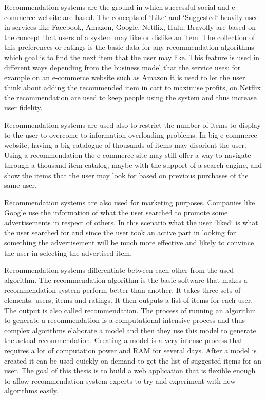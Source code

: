\summary

Recommendation systems are the ground in which successful social and e-commerce website are based. The concepts of `Like` and `Suggested` heavily used in services like Facebook, Amazon, Google, Netflix, Hulu, Bravofly are based on the concept that users of a system may like or dislike an item. The collection of this preferences or ratings is the basic data for any recommendation algorithms which goal is to find the next item that the user may like. This feature is used in different ways depending from the business model that the service uses: for example on an e-commerce website such as Amazon it is used to let the user think about adding the recommended item in cart to maximise profits, on Netflix the recommendation are used to keep people using the system and thus increase user fidelity.

Recommendation systems are used also to restrict the number of items to display to the user to overcome to information overloading problems. In big e-commerce website, having a big catalogue of thousands of items may disorient the user. Using a recommendation the e-commerce site may still offer a way to navigate through a thousand item catalog, maybe with the support of a search engine, and show the items that the user may look for based on previous purchases of the same user.

Recommendation systems are also used for marketing purposes. Companies like Google use the information of what the user searched to promote some advertisements in respect of others. In this scenario what the user `liked` is what the user searched for and since the user took an active part in looking for something the advertisement will be much more effective and likely to convince the user in selecting the advertised item.

Recommendation systems differentiate between each other from the used algorithm. The recommendation algorithm is the basic software that makes a recommendation system perform better than another. It takes three sets of elements: users, items and ratings. It then outputs a list of items for each user. The output is also called recommendation. The process of running an algorithm to generate a recommendation is a computational intensive process and thus complex algorithms elaborate a model and then they use this model to generate the actual recommendation. Creating a model is a very intense process that requires a lot of computation power and RAM for several days. After a model is created it can be used quickly on demand to get the list of suggested items for an user. The goal of this thesis is to build a web application that is flexible enough to allow recommendation system experts to try and experiment with new algorithms easily.

